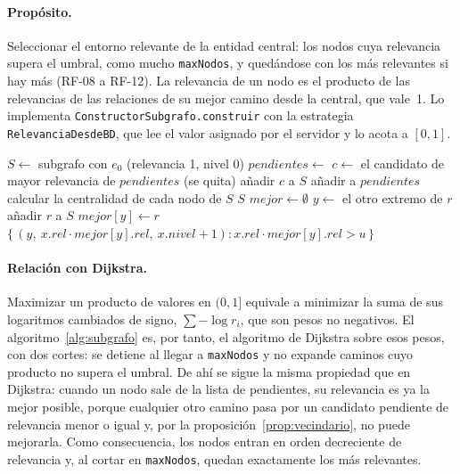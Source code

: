 \paragraph{Propósito.} Seleccionar el entorno relevante de la entidad central: los nodos cuya relevancia supera el umbral, como mucho \texttt{maxNodos}, y quedándose con los más relevantes si hay más (RF-08 a RF-12). La relevancia de un nodo es el producto de las relevancias de las relaciones de su mejor camino desde la central, que vale~1. Lo implementa \texttt{ConstructorSubgrafo.construir} con la estrategia \texttt{RelevanciaDesdeBD}, que lee el valor asignado por el servidor y lo acota a $[0,1]$.

\begin{algorithm}[htbp]
  \caption{Construcción del subgrafo (\texttt{ConstructorSubgrafo.construir}).}
  \label{alg:subgrafo}
  \begin{algorithmic}[1]
      \State $S \gets$ subgrafo con $e_0$ (relevancia 1, nivel 0)
      \State $pendientes \gets$ 
        \State $c \gets$ el candidato de mayor relevancia de $pendientes$ (se quita)
         
          \State añadir $c$ a $S$
          \State añadir  a $pendientes$
        \EndIf
      \EndWhile
      \State calcular la centralidad de cada nodo de $S$ 
      \State \Return $S$
    \EndFunction
    \Statex
      \State $mejor \gets \emptyset$ 
        \State $y \gets$ el otro extremo de $r$
         \State añadir $r$ a $S$ 
         \State $mejor[y] \gets r$
        \EndIf
      \EndFor
      \State \Return $\{\, (y,\ x.rel \cdot mejor[y].rel,\ x.nivel+1) : x.rel \cdot mejor[y].rel > u \,\}$
    \EndFunction
  \end{algorithmic}
\end{algorithm}

\paragraph{Relación con Dijkstra.} Maximizar un producto de valores en $(0,1]$ equivale a minimizar la suma de sus logaritmos cambiados de signo, $\sum -\log r_i$, que son pesos no negativos. El algoritmo~\ref{alg:subgrafo} es, por tanto, el algoritmo de Dijkstra sobre esos pesos, con dos cortes: se detiene al llegar a \texttt{maxNodos} y no expande caminos cuyo producto no supera el umbral. De ahí se sigue la misma propiedad que en Dijkstra: cuando un nodo sale de la lista de pendientes, su relevancia es ya la mejor posible, porque cualquier otro camino pasa por un candidato pendiente de relevancia menor o igual y, por la proposición~\ref{prop:vecindario}, no puede mejorarla. Como consecuencia, los nodos entran en orden decreciente de relevancia y, al cortar en \texttt{maxNodos}, quedan exactamente los más relevantes. \cite{TODO}


